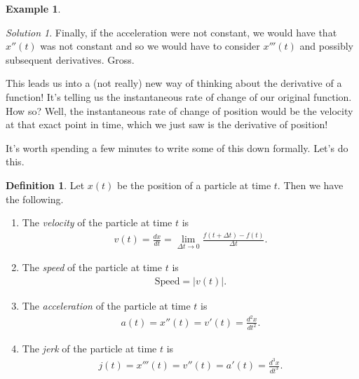 \documentclass[leqno]{article}
\theoremstyle{definition}
\newtheorem{definition}{Definition}[section]
\newtheorem{example}{Example}[section]
\theoremstyle{remark}
\newtheorem*{solution}{Solution}
\theoremstyle{theorem}
\begin{document}
\begin{example}
\begin{solution}
Finally, if the acceleration were not constant, we would have that $x''(t)$ was not constant and so we would have to consider $x'''(t)$ and possibly subsequent derivatives.  Gross.
\end{solution}
\end{example}

This leads us into a (not really) new way of thinking about the derivative of a function!  It's telling us the instantaneous rate of change of our original function.  How so? Well, the instantaneous rate of change of position would be the velocity at that exact point in time, which we just saw is the derivative of position! 

It's worth spending a few minutes to write some of this down formally.  Let's do this.

\begin{definition}
Let $x(t)$ be the position of a particle at time $t$. Then we have the following.
\begin{enumerate}[1.]
\item The \emph{velocity} of the particle at time $t$ is
\begin{align*}
v(t)=\frac{dx}{dt}=\lim_{\Delta t \to 0} \frac{f(t+\Delta t)- f(t)}{\Delta t}.
\end{align*}
\item The \emph{speed} of the particle at time $t$ is
\begin{align*}
\textrm{Speed}=|v(t)|.
\end{align*}
\item The \emph{acceleration} of the particle at time $t$ is
\begin{align*}
a(t)=x''(t)=v'(t)=\frac{d^2x}{dt^2}.
\end{align*}
\item The \emph{jerk} of the particle at time $t$ is
\begin{align*}
j(t)=x'''(t)=v''(t)=a'(t)=\frac{d^3 x}{dt^3}.
\end{align*}
\end{enumerate}
\end{definition}
\end{document}
